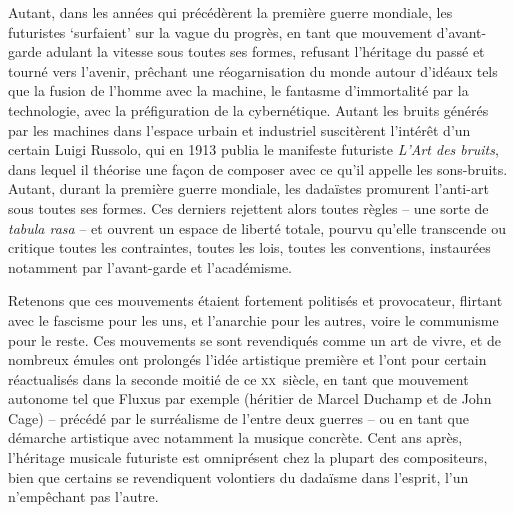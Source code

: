 \documentclass{article}
\begin{document}
Autant, dans les années qui précédèrent la première guerre mondiale, les futuristes `surfaient' sur la vague du progrès, en tant que mouvement d'avant-garde adulant la vitesse sous toutes ses formes, refusant l'héritage du passé et tourné vers l'avenir, prêchant une réogarnisation du monde autour d'idéaux tels que la fusion de l’homme avec la machine, le fantasme d'immortalité par la technologie, avec la préfiguration de la cybernétique. Autant les bruits générés par les machines dans l'espace urbain et industriel suscitèrent l'intérêt d'un certain Luigi Russolo, qui en 1913 publia le manifeste futuriste \textit{L'Art des bruits}, %
dans lequel il théorise une façon de composer avec ce qu'il appelle les sons-bruits. 
Autant, durant la première guerre mondiale, les dadaïstes promurent l'anti-art sous toutes ses formes. Ces derniers rejettent alors toutes règles -- une sorte de \textit{tabula rasa} -- et ouvrent un espace de liberté totale, pourvu qu'elle transcende ou critique toutes les contraintes, toutes les lois, toutes les conventions, instaurées notamment par l'avant-garde et l'académisme. 


Retenons que ces mouvements étaient fortement politisés et provocateur, flirtant avec le fascisme pour les uns, et l'anarchie pour les autres, voire le communisme pour le reste. %
Ces mouvements se sont revendiqués comme un art de vivre, et de nombreux émules ont prolongés l'idée artistique première et l'ont pour certain réactualisés dans la seconde moitié de ce \textsc{xx}\ieme ~siècle, en tant que mouvement autonome tel que Fluxus par exemple (héritier de Marcel Duchamp et de John Cage)  -- précédé par le surréalisme de l'entre deux guerres -- ou en tant que démarche artistique avec notamment la musique concrète. Cent ans après, l'héritage musicale futuriste est omniprésent chez la plupart des compositeurs, bien que certains se revendiquent volontiers du dadaïsme dans l'esprit, l'un n'empêchant pas l'autre. 


\end{document}
